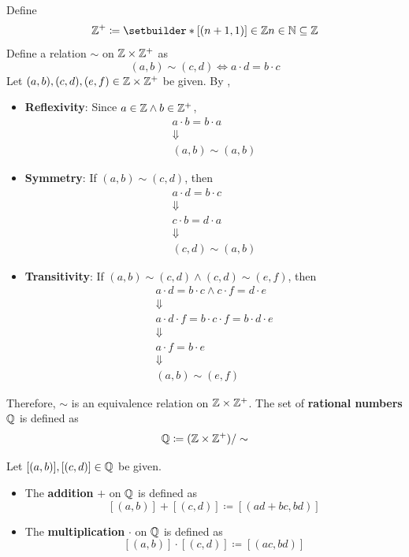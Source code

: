 Define
\[
\Z^{+} \coloneqq \setbuilder*{[(n + 1, 1)] \in \Z}{n \in \N} \subseteq \Z
\]
Define a relation $\sim$ on $\mathbb{Z} \times \mathbb{Z}^{+}$ as
\[
(a, b) \sim (c, d) \iff a \cdot d = b \cdot c
\]
Let $(a, b), (c, d), (e, f) \in \mathbb{Z} \times \mathbb{Z}^{+}$ be given. By ,
\begin{itemize}
    \item \textbf{Reflexivity}: Since $a \in \mathbb{Z} \land b \in \mathbb{Z}^{+}$,
    \[
    \begin{array}{c}
        a \cdot b = b \cdot a \\
        \Downarrow \\
        (a, b) \sim (a, b)
    \end{array}
    \]
    \item \textbf{Symmetry}: If $(a, b) \sim (c, d)$, then
    \[
    \begin{array}{c}
        a \cdot d = b \cdot c \\
        \Downarrow \\
        c \cdot b = d \cdot a \\
        \Downarrow \\
        (c, d) \sim (a, b)
    \end{array}
    \]
    \item \textbf{Transitivity}: If $(a, b) \sim (c, d) \land (c, d) \sim (e, f)$, then
    \[
    \begin{array}{c}
        a \cdot d = b \cdot c \land c \cdot f = d \cdot e \\
        \Downarrow \\
        a \cdot d \cdot f = b \cdot c \cdot f = b \cdot d \cdot e \\
        \Downarrow \\
        a \cdot f = b \cdot e \\
        \Downarrow \\
        (a, b) \sim (e, f)
    \end{array}
    \]
\end{itemize}
Therefore, $\sim$ is an equivalence relation on $\mathbb{Z} \times \mathbb{Z}^{+}$.
The set of \textbf{rational numbers} $\mathbb{Q}$ is defined as
\[
\mathbb{Q} \coloneqq (\mathbb{Z} \times \mathbb{Z}^{+}) / \sim
\]

\bigskip

\begin{definition} \label{an:def:operations-on-Q}
    Let $[(a, b)], [(c, d)] \in \mathbb{Q}$ be given.
    \begin{itemize}
        \item The \textbf{addition} $+$ on $\mathbb{Q}$ is defined as
        \[
        [(a, b)] + [(c, d)] \coloneqq [(ad + bc, bd)]
        \]
        \item The \textbf{multiplication} $\cdot$ on $\mathbb{Q}$ is defined as
        \[
        [(a, b)] \cdot [(c, d)] \coloneqq [(ac, bd)]
        \]
    \end{itemize}
\end{definition}


